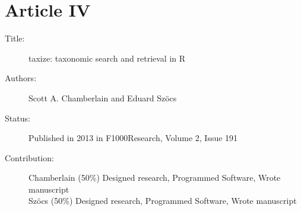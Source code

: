 \section*{Article IV}
\small
\begin{description}
	\item[Title:] taxize: taxonomic search and retrieval in R
	\item[Authors:] Scott A. Chamberlain and Eduard Szöcs
	\item[Status:] Published in 2013 in F1000Research, Volume 2, Issue 191
	\item[Contribution:] Chamberlain (50\%) Designed research, Programmed Software, Wrote manuscript\\
	Szöcs (50\%) Designed research, Programmed Software, Wrote manuscript
\end{description}
